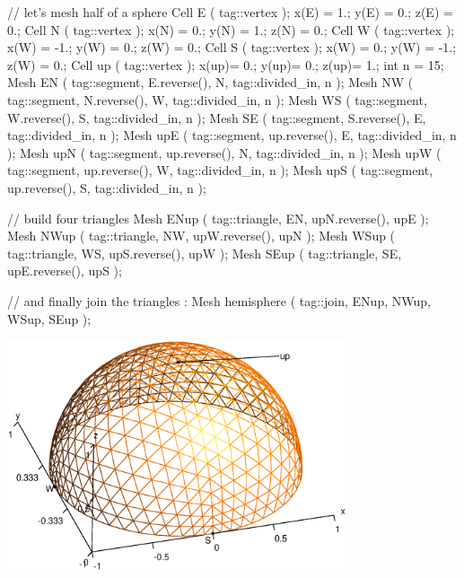    // let's mesh half of a sphere
   Cell E  ( tag::vertex );   x(E) =  1.;   y(E) =  0.;   z(E) = 0.;
   Cell N  ( tag::vertex );   x(N) =  0.;   y(N) =  1.;   z(N) = 0.;
   Cell W  ( tag::vertex );   x(W) = -1.;   y(W) =  0.;   z(W) = 0.;
   Cell S  ( tag::vertex );   x(W) =  0.;   y(W) = -1.;   z(W) = 0.;
   Cell up ( tag::vertex );   x(up)=  0.;   y(up)=  0.;   z(up)= 1.;
   int n = 15;
   Mesh EN ( tag::segment, E.reverse(), N, tag::divided_in, n );
   Mesh NW ( tag::segment, N.reverse(), W, tag::divided_in, n );
   Mesh WS ( tag::segment, W.reverse(), S, tag::divided_in, n );
   Mesh SE ( tag::segment, S.reverse(), E, tag::divided_in, n );
   Mesh upE ( tag::segment, up.reverse(), E, tag::divided_in, n );
   Mesh upN ( tag::segment, up.reverse(), N, tag::divided_in, n );
   Mesh upW ( tag::segment, up.reverse(), W, tag::divided_in, n );
   Mesh upS ( tag::segment, up.reverse(), S, tag::divided_in, n );

   // build four triangles
   Mesh ENup ( tag::triangle, EN, upN.reverse(), upE );
   Mesh NWup ( tag::triangle, NW, upW.reverse(), upN );
   Mesh WSup ( tag::triangle, WS, upS.reverse(), upW );
   Mesh SEup ( tag::triangle, SE, upE.reverse(), upS );

   // and finally join the triangles :
   Mesh hemisphere ( tag::join, ENup, NWup, WSup, SEup );
\endverbatim

{ 
\centerline{\includegraphics[width=10cm]{hemisphere.eps}} }

